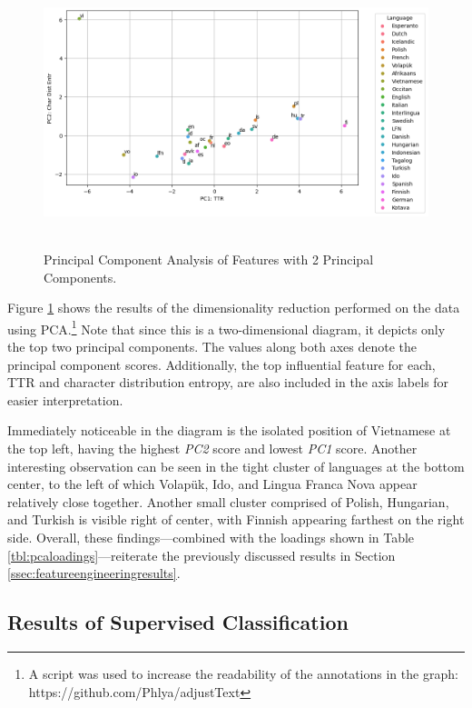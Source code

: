 \documentclass[12pt,a4paper]{article}
\numberwithin{figure}{section}
\numberwithin{table}{section}
\numberwithin{definition}{section}
\begin{document}
\begin{figure}[!h]
  \centering
    \caption{Principal Component Analysis of Features with 2 Principal Components.}
    \includegraphics[width=1.0\textwidth]{PCA_of_Features.png}
    \label{fig:pcaanalysis}\
\end{figure}

Figure \ref{fig:pcaanalysis} shows the results of the dimensionality reduction performed on the data using PCA.\footnote{A script was used to increase the readability of the annotations in the graph: https://github.com/Phlya/adjustText} Note that since this is a two-dimensional diagram, it depicts only the top two principal components. The values along both axes denote the principal component scores. Additionally, the top influential feature for each, TTR and character distribution entropy, are also included in the axis labels for easier interpretation. 

Immediately noticeable in the diagram is the isolated position of Vietnamese at the top left, having the highest \textit{PC2} score and lowest \textit{PC1} score. Another interesting observation can be seen in the tight cluster of languages at the bottom center, to the left of which Volapük, Ido, and Lingua Franca Nova appear relatively close together. Another small cluster comprised of Polish, Hungarian, and Turkish is visible right of center, with Finnish appearing farthest on the right side. Overall, these findings---combined with the loadings shown in Table \ref{tbl:pcaloadings}---reiterate the previously discussed results in Section \ref{ssec:featureengineeringresults}.


\subsection{Results of Supervised Classification}
\label{ssec:classificationresults}
\end{document}
